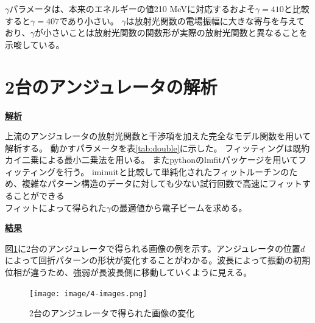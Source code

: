 \documentclass[a4paper,11pt,uplatex]{jsbook}
\begin{document}
$\gamma$パラメータは、本来のエネルギーの値210 MeVに対応するおよそ$\gamma =410$と比較すると$\gamma = 407$であり小さい。
$\gamma$は放射光関数の電場振幅に大きな寄与を与えており、$\gamma$が小さいことは放射光関数の関数形が実際の放射光関数と異なることを示唆している。


\section{2台のアンジュレータの解析}
\noindent \textbf{\underline{解析}}\par
上流のアンジュレータの放射光関数と干渉項を加えた完全なモデル関数を用いて解析する。
動かすパラメータを表\ref{tab:double}に示した。
フィッティングは既約カイ二乗による最小二乗法を用いる。
またpythonのlmfitパッケージ\cite{lmfit}を用いてフィッティングを行う。
iminuitと比較して単純化されたフィットルーチンのため、複雑なパターン構造のデータに対しても少ない試行回数で高速にフィットすることができる\\
フィットによって得られた$\gamma$の最適値から電子ビームを求める。

\noindent \textbf{\underline{結果}}\par
図\ref{images}に2台のアンジュレータで得られる画像の例を示す。アンジュレータの位置$d$によって回折パターンの形状が変化することがわかる。波長によって振動の初期位相が違うため、強弱が長波長側に移動していくように見える。
\begin{figure}[H]
  \centering
  \texttt{[image: image/4-images.png]}
  \caption[干渉による画像の変化]{2台のアンジュレータで得られた画像の変化}\label{images}
\end{figure}
\end{document}
